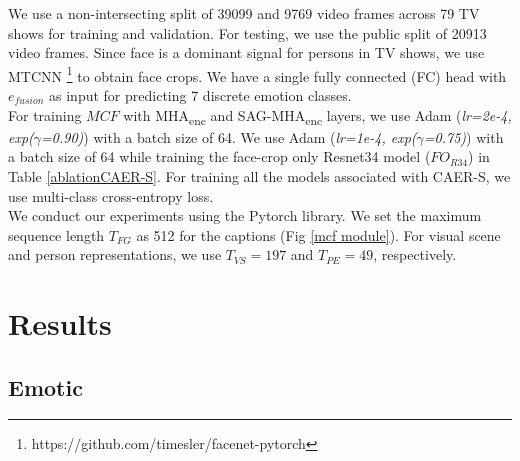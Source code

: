 We use a non-intersecting split of 39099 and 9769 video frames across 79 TV shows for training and validation. For testing, we use the public split of 20913 video frames. Since face is a dominant signal for persons in TV shows, we use MTCNN \cite{MTCNN} \footnote{https://github.com/timesler/facenet-pytorch} to obtain face crops. We have a single fully connected (FC) head with $e_{fusion}$ as input for predicting 7 discrete emotion classes. \\
For training $MCF$ with MHA\textsubscript{enc} and SAG-MHA\textsubscript{enc} layers, we use Adam (\textit{lr=2e-4, exp($\gamma$=0.90)}) with a batch size of 64. We use Adam (\textit{lr=1e-4, exp($\gamma$=0.75)}) with a batch size of 64 while training the face-crop only Resnet34 model ($FO_{R34}$) in Table \ref{ablationCAER-S}. For training all the models associated with CAER-S, we use multi-class cross-entropy loss.
\\
We conduct our experiments using the Pytorch \cite{Paszke2019PyTorchAI} library. We set the maximum sequence length $T_{FG}$ as 512 for the captions (Fig \ref{mcf module}). For visual scene and person representations, we use $T_{VS}=197$ and $T_{PE}=49$, respectively.

\section{Results}

\subsection{Emotic}

